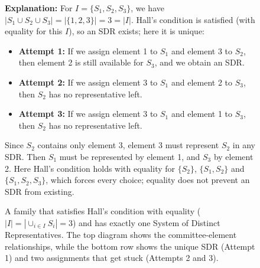 \documentclass{article}
\theoremstyle{definition}
\begin{document}
\begin{figure}[ht]

\vspace{0.3cm}
\noindent\parbox{\textwidth}{
\small \textbf{Explanation:} For $I = \{S_1, S_2, S_3\}$, we have $|S_1 \cup S_2 \cup S_3| = |\{1, 2, 3\}| = 3 = |I|$. 
Hall's condition is satisfied (with equality for this $I$), so an SDR exists; here it is unique:

\begin{itemize}[leftmargin=0.8cm,topsep=0.1cm,itemsep=0.1cm]
\item \textbf{Attempt 1:} If we assign element 1 to $S_1$ and element 3 to $S_2$, then element 2 is still available for $S_3$, and we obtain an SDR.
\item \textbf{Attempt 2:} If we assign element 3 to $S_1$ and element 2 to $S_3$, then $S_2$ has no representative left.
\item \textbf{Attempt 3:} If we assign element 3 to $S_1$ and element 1 to $S_3$, then $S_2$ has no representative left.
\end{itemize}

Since $S_2$ contains only element 3, element 3 must represent $S_2$ in any SDR. Then $S_1$ must be represented by element 1, and $S_3$ by element 2. Here Hall's condition holds with equality for $\{S_2\}$, $\{S_1, S_2\}$ and $\{S_1, S_2, S_3\}$, which forces every choice; equality does not prevent an SDR from existing.
}
\caption{A family that satisfies Hall's condition with equality ($|I| = |\cup_{i \in I} S_i| = 3$) and has exactly one System of Distinct Representatives. The top diagram shows the committee-element relationships, while the bottom row shows the unique SDR (Attempt 1) and two assignments that get stuck (Attempts 2 and 3).}
\label{fig:sdr-unique}
\end{figure}
\end{document}
